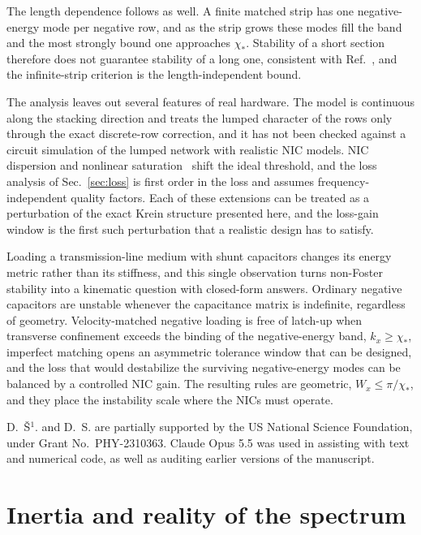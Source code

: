 \documentclass[aps,prapplied,twocolumn,superscriptaddress,floatfix,longbibliography]{revtex4-2}
\begin{document}
The length dependence follows as well. A finite matched strip has one negative-energy mode per negative row, and as the strip grows these modes fill the band and the most strongly bound one approaches $\chi_*$. Stability of a short section therefore does not guarantee stability of a long one, consistent with Ref.~\cite{Rengarajan_2013:AWPL}, and the infinite-strip criterion is the length-independent bound.

The analysis leaves out several features of real hardware. The model is continuous along the stacking direction and treats the lumped character of the rows only through the exact discrete-row correction, and it has not been checked against a circuit simulation of the lumped network with realistic NIC models. NIC dispersion and nonlinear saturation~\cite{Okorn_2017:Automatika} shift the ideal threshold, and the loss analysis of Sec.~\ref{sec:loss} is first order in the loss and assumes frequency-independent quality factors. Each of these extensions can be treated as a perturbation of the exact Krein structure presented here, and the loss-gain window is the first such perturbation that a realistic design has to satisfy.

Loading a transmission-line medium with shunt capacitors changes its energy metric rather than its stiffness, and this single observation turns non-Foster stability into a kinematic question with closed-form answers. Ordinary negative capacitors are unstable whenever the capacitance matrix is indefinite, regardless of geometry. Velocity-matched negative loading is free of latch-up when transverse confinement exceeds the binding of the negative-energy band, $k_x\ge\chi_*$, imperfect matching opens an asymmetric tolerance window that can be designed, and the loss that would destabilize the surviving negative-energy modes can be balanced by a controlled NIC gain. The resulting rules are geometric, $W_x\le\pi/\chi_*$, and they place the instability scale where the NICs must operate.

\begin{acknowledgments}
D.~\v{S}$^1$. and D.~S. are partially supported by the US National Science Foundation, under Grant No.~PHY-2310363. Claude Opus 5.5 was used in assisting with text and numerical code, as well as auditing earlier versions of the manuscript. 
\end{acknowledgments}



\appendix

\section{Inertia and reality of the spectrum}
\label{app:inertia}
\end{document}
